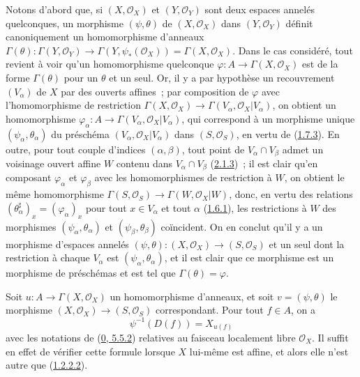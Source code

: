 Notons d'abord que, si $(X,\mathscr{O}_X)$ et $(Y,\mathscr{O}_Y)$ sont deux
espaces annelés quelconques, un morphisme $(\psi,\theta)$ de
$(X,\mathscr{O}_X)$ dans $(Y,\mathscr{O}_Y)$ définit canoniquement un
homomorphisme d'anneaux
$\Gamma(\theta):\Gamma(Y,\mathscr{O}_Y)\to
\Gamma(Y,\psi_*(\mathscr{O}_X))=\Gamma(X,\mathscr{O}_X)$. Dans le cas
considéré, tout revient à voir qu'un homomorphisme quelconque
$\varphi:A\to\Gamma(X,\mathscr{O}_X)$ est de la forme $\Gamma(\theta)$ pour
un $\theta$ et un seul. Or, il y a par hypothèse un recouvrement $(V_\alpha)$
de $X$ par des ouverts affines~; par composition de $\varphi$ avec
l'homomorphisme de restriction
$\Gamma(X,\mathscr{O}_X)\to
\Gamma(V_\alpha,\mathscr{O}_X|V_\alpha)$, on obtient un homomorphisme
$\varphi_\alpha:A\to\Gamma(V_\alpha,\mathscr{O}_X|V_\alpha)$, qui correspond
à un morphisme unique $(\psi_\alpha,\theta_\alpha)$ du préschéma
$(V_\alpha,\mathscr{O}_X|V_\alpha)$ dans $(S,\mathscr{O}_S)$, en vertu de
(\hyperref[I.1.7.3-fr]{1.7.3}). En outre, pour tout couple d'indices
$(\alpha,\beta)$, tout point de $V_\alpha\cap V_\beta$ admet un voisinage
ouvert affine $W$ contenu dans $V_\alpha\cap V_\beta$
(\hyperref[I.2.1.3-fr]{2.1.3})~; il est clair qu'en composant $\varphi_\alpha$
et $\varphi_\beta$ avec les homomorphismes de restriction à $W$, on obtient
le même homomorphisme
$\Gamma(S,\mathscr{O}_S)\to\Gamma(W,\mathscr{O}_X|W)$, donc, en vertu des
relations $(\theta_\alpha^\sharp)_x=(\varphi_\alpha)_x$ pour tout
$x\in V_\alpha$ et tout $\alpha$ (\hyperref[I.1.6.1-fr]{1.6.1}), les
restrictions à $W$ des morphismes $(\psi_\alpha,\theta_\alpha)$ et
$(\psi_\beta,\theta_\beta)$ coïncident. On en conclut qu'il y a un morphisme
d'espaces annelés
$(\psi,\theta):(X,\mathscr{O}_X)\to(S,\mathscr{O}_S)$ et un seul dont la
restriction à chaque $V_\alpha$ est $(\psi_\alpha,\theta_\alpha)$, et il est
clair que ce morphisme est un morphisme de préschémas et est tel que
$\Gamma(\theta)=\varphi$.

Soit $u:A\to\Gamma(X,\mathscr{O}_X)$ un homomorphisme d'anneaux, et soit
$v=(\psi,\theta)$ le morphisme $(X,\mathscr{O}_X)\to(S,\mathscr{O}_S)$
correspondant. Pour tout $f\in A$, on a
\begin{equation}
  \psi^{-1}(D(f))=X_{u(f)}
  \tag{2.2.4.1}\label{I.2.2.4.1-fr}
\end{equation}
avec les notations de (\hyperref[0.5.5.2-fr]{0, 5.5.2}) relatives au faisceau
localement libre $\mathscr{O}_X$. Il suffit en effet de vérifier cette formule
lorsque $X$ lui-même est affine, et alors elle n'est autre que
(\hyperref[I.1.2.2.2-fr]{1.2.2.2}).

